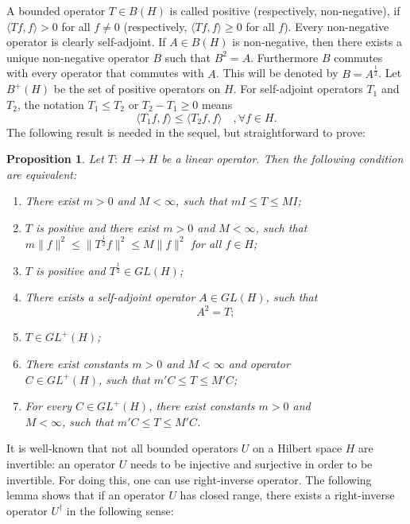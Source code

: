 \documentclass[11pt]{amsart}
\newtheorem{prop}[thm]{Proposition}
\theoremstyle{definition}
\theoremstyle{remark}
\numberwithin{equation}{section}
\begin{document}
A bounded operator $T\in B(H)$ is called positive (respectively, non-negative), if $\langle Tf,f\rangle>0$ for all $f\ne0$ (respectively, $\langle Tf,f\rangle\ge0$ for all $f$).
Every non-negative operator is clearly self-adjoint.
If $A\in B(H)$  is non-negative, then there exists a unique non-negative operator $B$ such that $B^2=A$. Furthermore $B$ commutes with every operator that commutes with $A$.
This will be denoted by $B=A^{\frac{1}{2}}$. Let $B^+(H)$ be the set of positive operators on $H$. For self-adjoint operators $T_1$ and $T_2$, the notation $T_1\leq T_2$ or $T_2-T_1\geq 0$ means
$$ \langle T_1 f,f\rangle\leq \langle T_2f,f\rangle \quad ,\forall f\in H.  $$
The following result is needed in the sequel, but straightforward to prove:
\begin{prop}\cite{ole}\label{prp:equs}
Let $T:\ H\to H$ be a linear operator. Then the following condition are equivalent:
\begin{enumerate}
\item There exist $m>0$ and $M<\infty$, such that $mI\le T\le MI$;
\item $T$ is positive and there exist $m>0$ and $M<\infty$, such that $m\|f\|^2\le \|T^{\frac{1}{2}}f\|^2\le M\|f\|^2$ for all $f\in H$;
\item $T$ is positive and $T^{\frac{1}{2}}\in GL(H)$;
\item There exists a self-adjoint operator  $A\in GL(H)$, such that \[A^2=T;\]
\item $T\in GL^+(H)$;
\item There exist constants $m>0$ and $M<\infty$ and operator\\ $C\in GL^+(H)$, such that $m'C\le T\le M'C$;
\item For every $C\in GL^+(H)$, there exist constants $m>0$ and\\ $M<\infty$, such that $m'C\le T\le M'C$.
\end{enumerate}
\end{prop}

It is well-known that not all bounded operators $U$ on a Hilbert space $H$
are invertible: an operator $U$ needs to be injective and surjective in order
to be invertible. For doing this, one can use right-inverse operator.  The following lemma shows that if an operator $U$ has closed range,
there exists a right-inverse operator $U^\dagger$ in the following sense:
\end{document}
